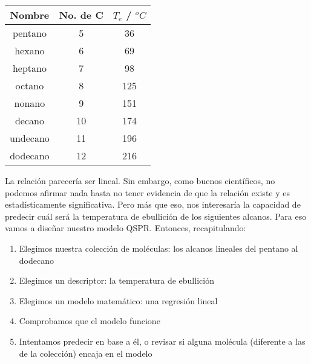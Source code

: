 \documentclass[10pt,letterpaper]{article}
\begin{document}
\begin{center}
\begin{tabular}{ccc}
\hline
\textbf{Nombre} & \textbf{No. de C} & \textbf{$T_{e}$ / $^o C$}\\
\hline
pentano & 5 & 36\\
hexano & 6 & 69\\
heptano & 7 & 98\\
octano & 8 & 125\\
nonano & 9 & 151\\
decano & 10 & 174\\
undecano & 11 & 196\\
dodecano & 12 & 216\\
\hline
\end{tabular}
\end{center}

La relaci\'on parecer\'ia ser lineal. Sin embargo, como buenos cient\'ificos, no podemos afirmar nada hasta no tener evidencia de que la relaci\'on existe y es estad\'isticamente significativa. Pero m\'as que eso, nos interesar\'ia la capacidad de predecir cu\'al ser\'a la temperatura de ebullici\'on de los siguientes alcanos. Para eso vamos a dise\~nar nuestro modelo QSPR. Entonces, recapitulando:

\begin{enumerate}
\item Elegimos nuestra colecci\'on de mol\'eculas: los alcanos lineales del pentano al dodecano
\item Elegimos un descriptor: la temperatura de ebullici\'on
\item Elegimos un modelo matem\'atico: una regresi\'on lineal
\item Comprobamos que el modelo funcione
\item Intentamos predecir en base a \'el, o revisar si alguna mol\'ecula (diferente a las de la colecci\'on) encaja en el modelo
\end{enumerate}
\end{document}
